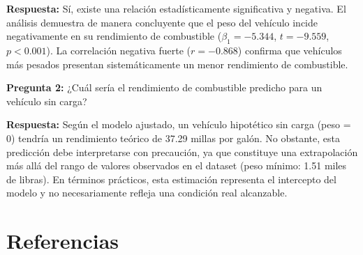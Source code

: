\documentclass[12pt, letterpaper]{article}
\begin{document}
    \textbf{Respuesta:} Sí, existe una relación estadísticamente significativa y
    negativa. El análisis demuestra de manera concluyente que el peso del vehículo
    incide negativamente en su rendimiento de combustible ($\beta_1 = -5.344$,
    $t = -9.559$, $p < 0.001$). La correlación negativa fuerte ($r = -0.868$)
    confirma que vehículos más pesados presentan sistemáticamente un menor rendimiento
    de combustible.

    \textbf{Pregunta 2:} ¿Cuál sería el rendimiento de combustible predicho para
    un vehículo sin carga?

    \textbf{Respuesta:} Según el modelo ajustado, un vehículo hipotético sin carga
    (peso = 0) tendría un rendimiento teórico de 37.29 millas por galón. No obstante,
    esta predicción debe interpretarse con precaución, ya que constituye una
    extrapolación más allá del rango de valores observados en el dataset (peso mínimo:
    1.51 miles de libras). En términos prácticos, esta estimación representa el
    intercepto del modelo y no necesariamente refleja una condición real alcanzable.


    \newpage

    \section{Referencias}

    \printbibliography
    [heading=none]


    \nocite{pearson1896}
    \nocite{henderson1981}
    \nocite{montgomery2012}
    \nocite{james2013}
    \nocite{kutner2005}
    \nocite{anscombe1973}
    \nocite{cohen2003}
    \nocite{breusch1979}
    \nocite{shapiro1965}
    \nocite{fox2016}
    \nocite{rawlings1998}
    
\end{document}
